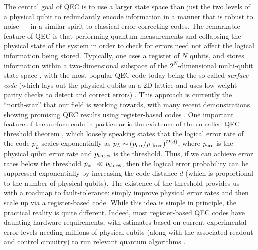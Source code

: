The central goal of QEC is to use a larger state space than just the two levels of a physical qubit to redundantly encode information in a manner that is robust to noise --- in a similar spirit to classical error correcting codes.
The remarkable feature of QEC is that performing quantum measurements and collapsing the physical state of the system in order to check for errors need not affect the logical information being stored. Typically, one uses a register of $N$ qubits, and stores information within a two-dimensional subspace of the $2^N$-dimensional multi-qubit state space \cite{shor1995scheme, steane1996error, gottesman1996class, kitaev2003fault, fowler2012surface}, with the most popular QEC code today being the so-called \textit{surface code} (which lays out the physical qubits on a 2D lattice and uses low-weight parity checks to detect and correct errors) \cite{fowler2012surface}. This approach is currently the ``north-star'' that our field is working towards, with many recent demonstrations showing promising QEC results using register-based codes \cite{google2023suppressing, bluvstein2024logical, campbell2024series}. One important feature of the surface code in particular is the existence of the so-called QEC threshold theorem \cite{aharonov1997fault,knill1998resilient}, which loosely speaking states that the logical error rate of the code $p_L$ scales exponentially as $p_L \sim (p_{\rm err}/p_{\rm thres})^{\mathcal{O}(d)}$, where $p_{\rm err}$ is the physical qubit error rate and $p_{\rm thres}$ is the threshold. Thus, if we can achieve error rates below the threshold $p_{\rm err} \ll p_{\rm thres}$, then the logical error probability can be suppressed exponentially by increasing the code distance $d$ (which is proportional to the number of physical qubits). The existence of the threshold provides us with a roadmap to fault-tolerance: simply improve physical error rates and then scale up via a register-based code. While this idea is simple in principle, the practical reality is quite different. Indeed, most register-based QEC codes have daunting hardware requirements, with estimates based on current experimental error levels needing millions of physical qubits (along with the associated readout and control circuitry) to run relevant quantum algorithms \cite{gidney2021factor}. 

